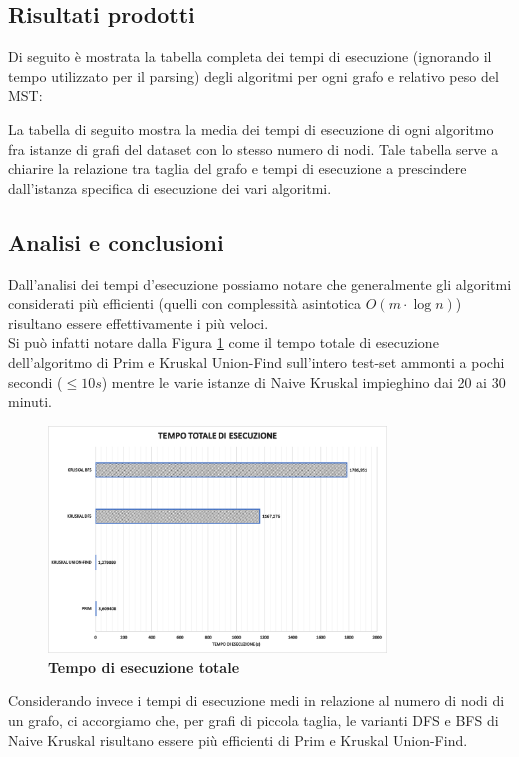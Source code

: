 \documentclass[]{article}
\begin{document}
\subsection{Risultati prodotti}
\begin{flushleft}
Di seguito è mostrata la tabella completa dei tempi di esecuzione (ignorando il tempo utilizzato per il parsing) degli algoritmi per ogni grafo e relativo peso del MST: 


La tabella di seguito mostra la media dei tempi di esecuzione di ogni algoritmo fra istanze di grafi del dataset con lo stesso numero di nodi. Tale tabella serve a chiarire la relazione tra taglia del grafo e tempi di esecuzione a prescindere dall'istanza specifica di esecuzione dei vari algoritmi.

\newpage
\subsection{Analisi e conclusioni}
Dall'analisi dei tempi d'esecuzione possiamo notare che generalmente gli algoritmi considerati più efficienti (quelli con complessità asintotica $O(m\cdot\log n)$) risultano essere effettivamente i più veloci.\\
Si può infatti notare dalla Figura \ref{total} come il tempo totale di esecuzione dell'algoritmo di Prim e Kruskal Union-Find sull'intero test-set ammonti a pochi secondi ($\leq 10 s$) mentre le varie istanze di Naive Kruskal impieghino dai 20 ai 30 minuti.
\begin{figure}[H]
	\centering
	\includegraphics[width=0.8\textwidth,height=\textheight,keepaspectratio]{grafo_costo_totale.png}
	\caption{\textbf{Tempo di esecuzione totale}}
	\label{total}
\end{figure}
Considerando invece i tempi di esecuzione medi in relazione al numero di nodi di un grafo, ci accorgiamo che, per grafi di piccola taglia, le varianti DFS e BFS di Naive Kruskal risultano essere più efficienti di Prim e Kruskal Union-Find.\\

\end{flushleft}
\end{document}
